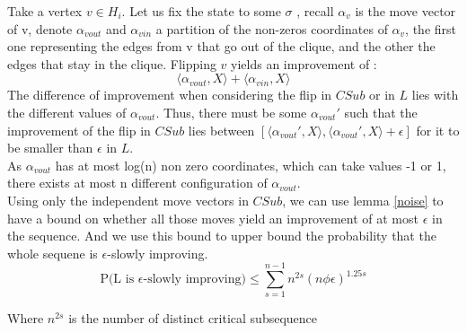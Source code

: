 \documentclass[12pt]{article}
\begin{document}
Take a vertex $v \in H_i$. Let us fix the state to some $\sigma$ , recall $\alpha_v$ is the move vector of v, denote $\alpha_{vout}$ and $\alpha_{vin}$ a partition of the non-zeros coordinates of $\alpha_v$, the first one representing the edges from v that go out of the clique, and the other the edges that stay in the clique. Flipping $v$ yields an improvement of :
\begin{equation*}
\langle \alpha_{vout}, X\rangle + \langle \alpha_{vin}, X\rangle
\end{equation*}
The difference of improvement when considering the flip in $CSub$ or in $L$ lies with the different values of $\alpha_{vout}$. Thus, there must be some $\alpha_{vout}'$ such that the improvement of the flip in $CSub$ lies between $[\langle \alpha_{vout}', X\rangle, \langle \alpha_{vout}', X\rangle + \epsilon]$ for it to be smaller than $\epsilon$ in $L$.\\
As $\alpha_{vout}$ has at most log(n) non zero coordinates, which can take values -1 or 1, there exists at most n different configuration of $\alpha_{vout}$.\\
 Using only the independent move vectors in $CSub$, we can use lemma \ref{noise} to have a bound on whether all those moves yield an improvement of at most $\epsilon$ in the sequence. And we use this bound to upper bound the probability that the whole sequene is $\epsilon$-slowly improving.
 \begin{equation*}
 \text{P(L is }\epsilon\text{-slowly improving}) \leq \sum_{s = 1}^{n - 1} n^{2s}(n\phi\epsilon)^{1.25s}
 \end{equation*}
 
Where $n^{2s}$ is the number of distinct critical subsequence 



\end{document}
